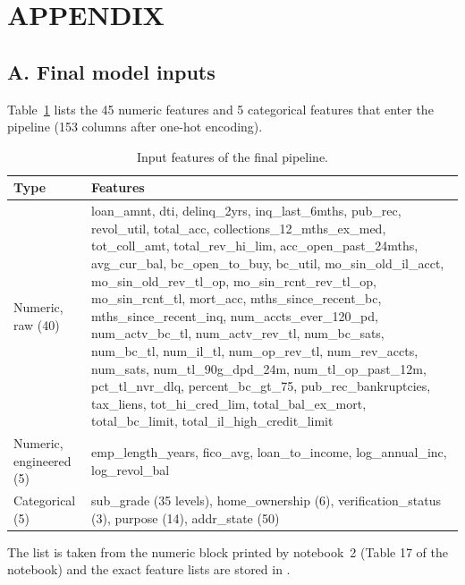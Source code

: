 \section*{APPENDIX}

\subsection*{A. Final model inputs}

Table~\ref{tab:appfeat} lists the 45 numeric features and 5 categorical features that enter the pipeline (153 columns after one-hot encoding).

\begin{table}[H]
\centering
\caption{Input features of the final pipeline.}
\label{tab:appfeat}
\small
\begin{tabularx}{\textwidth}{|>{\raggedright\arraybackslash}p{3cm}|>{\raggedright\arraybackslash}X|}
\hline
\textbf{Type} & \textbf{Features} \\
\hline
Numeric, raw (40) & loan\_amnt, dti, delinq\_2yrs, inq\_last\_6mths, pub\_rec, revol\_util, total\_acc, collections\_12\_mths\_ex\_med, tot\_coll\_amt, total\_rev\_hi\_lim, acc\_open\_past\_24mths, avg\_cur\_bal, bc\_open\_to\_buy, bc\_util, mo\_sin\_old\_il\_acct, mo\_sin\_old\_rev\_tl\_op, mo\_sin\_rcnt\_rev\_tl\_op, mo\_sin\_rcnt\_tl, mort\_acc, mths\_since\_recent\_bc, mths\_since\_recent\_inq, num\_accts\_ever\_120\_pd, num\_actv\_bc\_tl, num\_actv\_rev\_tl, num\_bc\_sats, num\_bc\_tl, num\_il\_tl, num\_op\_rev\_tl, num\_rev\_accts, num\_sats, num\_tl\_90g\_dpd\_24m, num\_tl\_op\_past\_12m, pct\_tl\_nvr\_dlq, percent\_bc\_gt\_75, pub\_rec\_bankruptcies, tax\_liens, tot\_hi\_cred\_lim, total\_bal\_ex\_mort, total\_bc\_limit, total\_il\_high\_credit\_limit \\
\hline
Numeric, engineered (5) & emp\_length\_years, fico\_avg, loan\_to\_income, log\_annual\_inc, log\_revol\_bal \\
\hline
Categorical (5) & sub\_grade (35 levels), home\_ownership (6), verification\_status (3), purpose (14), addr\_state (50) \\
\hline
\end{tabularx}
\end{table}

The list is taken from the numeric block printed by notebook~2 (Table 17 of the notebook) and the exact feature lists are stored in .
